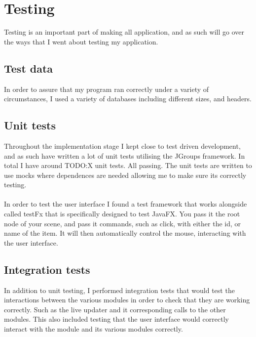 \section{Testing}
\label{sec:testing}

Testing is an important part of making all application, and as such will go over the ways that I went about testing my application.

\subsection{Test data}
\label{subsec:test_data}

In order to assure that my program ran correctly under a variety of circumstances, I used a variety of databases including different sizes, and headers. 

\subsection{Unit tests}
\label{subsec:unit_tests}

Throughout the implementation stage I kept close to test driven development, and as such have written a lot of unit tests utilising the JGroups framework. In total I have around TODO:X unit tests. All passing. The unit tests are written to use mocks where dependences are needed allowing me to make sure its correctly testing.
\\\\
In order to test the user interface I found a test framework that works alongside called testFx that is specifically designed to test JavaFX. You pass it the root node of your scene, and pass it commands, such as click, with either the id, or name of the item. It will then automatically control the mouse, interacting with the user interface.

\subsection{Integration tests}
\label{subsec:integration_tests}

In addition to unit testing, I performed integration tests that would test the interactions between the various modules in order to check that they are working correctly. Such as the live updater and it corresponding calls to the other modules. This also included testing that the user interface would correctly interact with the module and its various modules correctly.